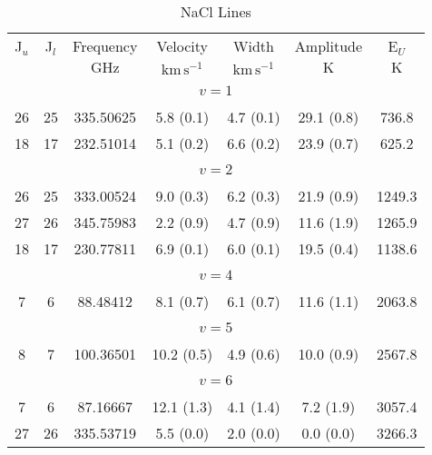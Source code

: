 \begin{table*}[htp]
\centering
\caption{NaCl Lines}
\begin{tabular}{ccccccc}
\label{tab:NaCl_salt_lines}
 J$_u$ & J$_l$ & Frequency & Velocity & Width & Amplitude & E$_U$ \\
  &  & $\mathrm{GHz}$ & $\mathrm{km\,s^{-1}}$ & $\mathrm{km\,s^{-1}}$ & $\mathrm{K}$ & $\mathrm{K}$ \\
\hline
&\vspace{-0.75em}\\
\multicolumn{7}{c}{$v = 1$} \\
\vspace{-0.75em}\\
 26 & 25 & 335.50625 & 5.8 (0.1) & 4.7 (0.1) & 29.1 (0.8) & 736.8 \\
 18 & 17 & 232.51014 & 5.1 (0.2) & 6.6 (0.2) & 23.9 (0.7) & 625.2 \\
&\vspace{-0.75em}\\
\multicolumn{7}{c}{$v = 2$} \\
\vspace{-0.75em}\\
 26 & 25 & 333.00524 & 9.0 (0.3) & 6.2 (0.3) & 21.9 (0.9) & 1249.3 \\
 27 & 26 & 345.75983 & 2.2 (0.9) & 4.7 (0.9) & 11.6 (1.9) & 1265.9 \\
 18 & 17 & 230.77811 & 6.9 (0.1) & 6.0 (0.1) & 19.5 (0.4) & 1138.6 \\
&\vspace{-0.75em}\\
\multicolumn{7}{c}{$v = 4$} \\
\vspace{-0.75em}\\
 7 & 6 & 88.48412 & 8.1 (0.7) & 6.1 (0.7) & 11.6 (1.1) & 2063.8 \\
&\vspace{-0.75em}\\
\multicolumn{7}{c}{$v = 5$} \\
\vspace{-0.75em}\\
 8 & 7 & 100.36501 & 10.2 (0.5) & 4.9 (0.6) & 10.0 (0.9) & 2567.8 \\
&\vspace{-0.75em}\\
\multicolumn{7}{c}{$v = 6$} \\
\vspace{-0.75em}\\
 7 & 6 & 87.16667 & 12.1 (1.3) & 4.1 (1.4) & 7.2 (1.9) & 3057.4 \\
 27 & 26 & 335.53719 & 5.5 (0.0) & 2.0 (0.0) & 0.0 (0.0) & 3266.3 \\
\hline
\end{tabular}

\par 
\end{table*}
